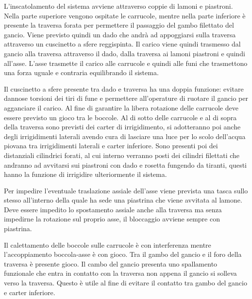 L'inscatolamento del sistema avviene attraverso coppie di lamoni e piastroni. Nella parte superiore vengono ospitate le carrucole, mentre nella parte inferiore è presente la traversa forata per permettere il passaggio del gambo filettato del gancio. Viene previsto quindi un dado che andrà ad appoggiarsi sulla traversa attraverso un cuscinetto a sfere reggispinta. Il carico viene quindi trasmesso dal gancio alla traversa attraverso il dado, dalla traversa ai lamoni piastroni e quindi all'asse. L'asse trasmette il carico alle carrucole e quindi alle funi che trasmettono una forza uguale e contraria equilibrando il sistema.

Il cuscinetto a sfere presente tra dado e traversa ha una doppia funzione: evitare dannose torsioni dei tiri di fune e permettere all'operature di ruotare il gancio per agganciare il carico.
Al fine di garantire la libera rotazione delle carrucole deve essere previsto un gioco tra le boccole. 
Al di sotto delle carrucole e al di sopra della traversa sono previsti dei carter di irrigidimento, si adotteranno poi anche degli irrigidimenti laterali avendo cura di lasciare una luce per lo scolo dell'acqua piovana tra irrigidimenti laterali e carter inferiore. Sono presenti poi dei distanziali cilindrici forati, al cui interno verranno posti dei cilindri filettati che andranno ad avvitarsi sui piastroni con dado e rosetta fungendo da tiranti, questi hanno la funzione di irrigidire ulteriormente il sistema. 

Per impedire l'eventuale traslazione assiale dell'asse viene prevista una tasca sullo stesso all'interno della quale ha sede una piastrina che viene avvitata al lamone. 
Deve essere impedito lo spostamento assiale anche alla traversa ma senza impedirne la rotazione sul proprio asse, il bloccaggio avviene sempre con piastrina. 

Il calettamento delle boccole sulle carrucole è con interferenza mentre l'accoppiamento boccola-asse è con gioco. Tra il gambo del gancio e il foro della traversa è presente gioco. Il cambo del gancio presenta uno spallamento funzionale che entra in contatto con la traversa non appena il gancio si solleva verso la traversa. Questo è utile al fine di evitare il contatto tra gambo del gancio e carter inferiore.

